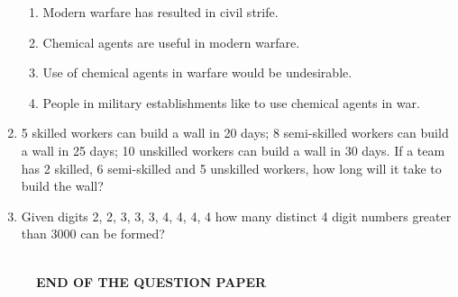 \documentclass[journal,12pt,onecolumn]{IEEEtran}
\theoremstyle{remark}
\begin{document}
\begin{enumerate}
\begin{enumerate}
	\item Modern warfare has resulted in civil strife.
	\item Chemical agents are useful in modern warfare.
	\item Use of chemical agents in warfare would be undesirable.
	\item People in military establishments like to use chemical agents in war.
\end{enumerate}

\item 5 skilled workers can build a wall in 20 days; 8 semi-skilled workers can build a wall in 25 days; 10 unskilled workers can build a wall in 30 days. If a team has 2 skilled, 6 semi-skilled and 5 unskilled workers, how long will it take to build the wall?\hfill{}

\begin{enumerate}  \end{enumerate}

\item Given digits 2, 2, 3, 3, 3, 4, 4, 4, 4 how many distinct 4 digit numbers greater than 3000 can be formed?\hfill{}

\begin{enumerate}  \end{enumerate}
\end{enumerate}

\begin{figure}[H] \centering
	\hrulefill\\
	\textbf{END OF THE QUESTION PAPER}
\end{figure}
\end{document}
